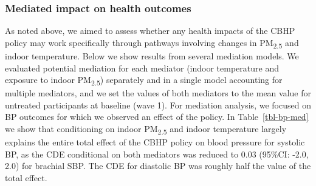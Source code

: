 \documentclass[
  letterpaper,
  DIV=11,
  numbers=noendperiod]{scrartcl}
\begin{document}
\hypertarget{mediated-impact-on-health-outcomes}{%
\subsubsection{Mediated impact on health
outcomes}\label{mediated-impact-on-health-outcomes}}

As noted above, we aimed to assess whether any health impacts of the
CBHP policy may work specifically through pathways involving changes in
PM\textsubscript{2.5} and indoor temperature. Below we show results from
several mediation models. We evaluated potential mediation for each
mediator (indoor temperature and exposure to indoor
PM\textsubscript{2.5}) separately and in a single model accounting for
multiple mediators, and we set the values of both mediators to the mean
value for untreated participants at baseline (wave 1). For mediation
analysis, we focused on BP outcomes for which we observed an effect of
the policy. In Table~\ref{tbl-bp-med} we show that conditioning on
indoor PM\textsubscript{2.5} and indoor temperature largely explains the
entire total effect of the CBHP policy on blood pressure for systolic
BP, as the CDE conditional on both mediators was reduced to 0.03
(95\%CI: -2.0, 2.0) for brachial SBP. The CDE for diastolic BP was
roughly half the value of the total effect.
\end{document}
